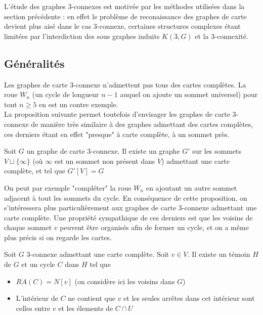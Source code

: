 \documentclass{scrartcl}
\begin{document}
\begin{flushleft}
L'étude des graphes $3$-connexes est motivée par les méthodes utilisées dans la section précédente : en effet le problème de
reconaissance des graphes de carte devient plus aisé dans le cas $3$-connexe, certaines structures complexes étant limitées
par l'interdiction des sous graphes induits $K(3, G)$ et la $3$-connexité.

\subsection{Généralités}

Les graphes de carte $3$-connexe n'admettent pas tous des cartes complètes. La roue $W_n$ (un cycle de longueur $n-1$ auquel on ajoute un
sommet universel) pour tout $n \geq 5$ en est un contre exemple.\\
La proposition suivante permet toutefois d'envisager les graphes de carte $3$-connexe de manière très similaire à des graphes admettant
des cartes complètes, ces derniers étant en effet "presque" à carte complète, à un sommet près.

\begin{prop}\label{3connCompl}
    Soit $G$ un graphe de carte $3$-connexe. Il existe un graphe $G'$ sur les sommets $V \sqcup \{\infty\}$ (où $\infty$ est un sommet non
    présent dans $V$) admettant une carte complète, et tel que $G'[V] = G$
\end{prop}

On peut par exemple "compléter" la roue $W_n$ en ajoutant un autre sommet adjacent à tout les sommets du cycle.
En conséquence de cette proposition, on s'intéressera plus particulièrement aux graphes de carte $3$-connexe admettant une carte complète.
Une propriété sympathique de ces derniers est que les voisins de chaque sommet $v$ peuvent être organisés afin
de former un cycle, et on a même plus précis si on regarde les cartes.

\begin{prop}\label{cyclSep}
    Soit $G$ $3$-connexe admettant une carte complète. Soit $v \in V$. Il existe un témoin $H$ de $G$ et
    un cycle $C$ dans $H$ tel que
    \begin{itemize}
        \item $RA(C) = N[v]$ (on considère ici les voisins dans $G$)
        \item L'intérieur de $C$ ne contient que $v$ et les seules arrêtes dans cet intérieur sont celles entre $v$ et
        les élements de $C \cap U$
    \end{itemize}
\end{prop}


\end{flushleft}
\end{document}
